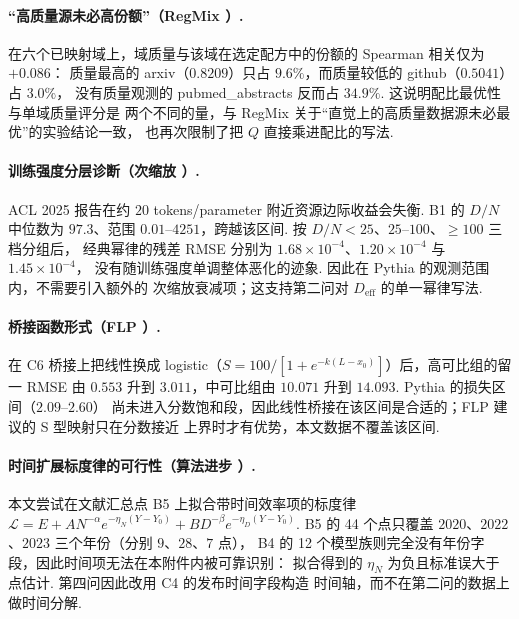 \paragraph{``高质量源未必高份额''（RegMix \cite{regmix}）. \quad}
在六个已映射域上，域质量与该域在选定配方中的份额的 Spearman 相关仅为 $+0.086$：
质量最高的 arxiv（$0.8209$）只占 $9.6\%$，而质量较低的 github（$0.5041$）占 $3.0\%$，
没有质量观测的 pubmed\_abstracts 反而占 $34.9\%$. 这说明配比最优性与单域质量评分是
两个不同的量，与 RegMix 关于``直觉上的高质量数据源未必最优''的实验结论一致，
也再次限制了把 $Q$ 直接乘进配比的写法. 

\paragraph{训练强度分层诊断（次缩放 \cite{acl2025quality}）. \quad}
ACL 2025 报告在约 $20$ tokens/parameter 附近资源边际收益会失衡. B1 的 $D/N$ 中位数为
$97.3$、范围 $0.01$--$4251$，跨越该区间. 按 $D/N<25$、$25$--$100$、$\ge100$ 三档分组后，
经典幂律的残差 RMSE 分别为 $1.68\times10^{-4}$、$1.20\times10^{-4}$ 与 $1.45\times10^{-4}$，
没有随训练强度单调整体恶化的迹象. 因此在 Pythia 的观测范围内，不需要引入额外的
次缩放衰减项；这支持第二问对 $D_{\mathrm{eff}}$ 的单一幂律写法. 

\paragraph{桥接函数形式（FLP \cite{flp}）. \quad}
在 C6 桥接上把线性换成 logistic（$S=100/[1+e^{-k(L-x_0)}]$）后，高可比组的留一 RMSE 由
$0.553$ 升到 $3.011$，中可比组由 $10.071$ 升到 $14.093$. Pythia 的损失区间（$2.09$--$2.60$）
尚未进入分数饱和段，因此线性桥接在该区间是合适的；FLP 建议的 S 型映射只在分数接近
上界时才有优势，本文数据不覆盖该区间. 

\paragraph{时间扩展标度律的可行性（算法进步 \cite{ho2024}）. \quad}
本文尝试在文献汇总点 B5 上拟合带时间效率项的标度律
$\mathcal L=E+AN^{-\alpha}e^{-\eta_N(Y-Y_0)}+BD^{-\beta}e^{-\eta_D(Y-Y_0)}$. 
B5 的 44 个点只覆盖 $2020$、$2022$、$2023$ 三个年份（分别 $9$、$28$、$7$ 点），
B4 的 12 个模型族则完全没有年份字段，因此时间项无法在本附件内被可靠识别：
拟合得到的 $\eta_N$ 为负且标准误大于点估计. 第四问因此改用 C4 的发布时间字段构造
时间轴，而不在第二问的数据上做时间分解. 



